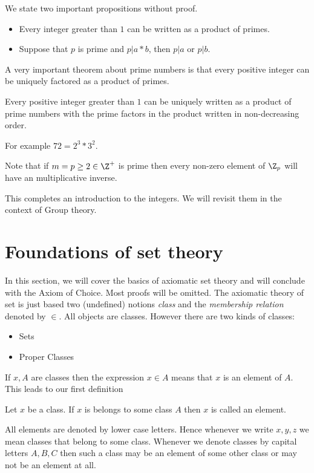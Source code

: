 We state two important propositions without proof. 
\begin{Proposition}
    \begin{itemize}
	\item Every integer greater than $1$ can be written as a product of primes.
	\item Suppose that $p$ is prime and $p | a*b$, then $p | a$ or $p | b$.
    \end{itemize}
\end{Proposition}

A very important theorem about prime numbers is that every positive integer can be uniquely factored
as a product of primes.
\begin{Theorem}[name=Fundamental theorem of Arithmetic]
    Every positive integer greater than $1$ can be uniquely written as a product of prime numbers
    with the prime factors in the product written in non-decreasing order.
\end{Theorem}

For example $72 = 2^3 * 3^2$.

Note that if $m = p \geq 2 \in \Z^{+}$ is prime then every non-zero element of $\Z_{p}$ will have an
multiplicative inverse.

This completes an introduction to the integers. We will revisit them in the context of Group theory.
\section{Foundations of set theory}\label{App:set_theory}
In this section, we will cover the basics of axiomatic set theory and will conclude with the 
Axiom of Choice. Most proofs will be omitted.
The axiomatic theory of set is just based two (undefined) notions \textit{class} and the 
\textit{membership relation} denoted by $\in$. All objects are classes. However there are two kinds
of classes:
\begin{itemize}
    \item Sets
    \item Proper Classes
\end{itemize}
If $x,A$ are classes then the expression $x \in A$ means that $x$ is an element of $A$. This leads
to our first definition
\begin{Definition}
    Let $x$ be a class. If $x$ is belongs to some class $A$ then $x$ is called an element.
\end{Definition}
All elements are denoted by lower case letters. Hence whenever we write $x,y,z$ we mean classes that
belong to some class. Whenever we denote classes by capital letters $A,B,C$ then such a class may be
an element of some other class or may not be an element at all.

